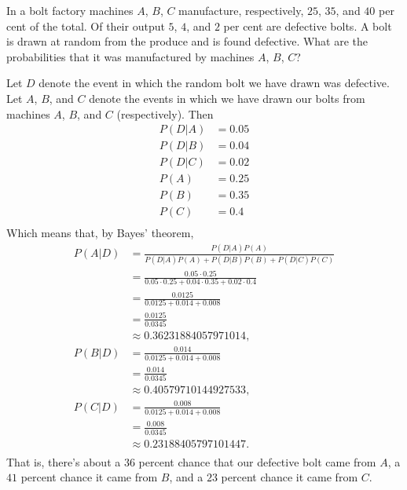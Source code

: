 \begin{problem}[Handout 4, \# 8]
  In a bolt factory machines \(A\), \(B\), \(C\) manufacture, respectively,
  \(25\), \(35\), and \(40\) per cent of the total. Of their output \(5\),
  \(4\), and \(2\) per cent are defective bolts. A bolt is drawn at random
  from the produce and is found defective. What are the probabilities that
  it was manufactured by machines \(A\), \(B\), \(C\)?
\end{problem}
\begin{solution}
  Let $D$ denote the event in which the random bolt we have drawn was
  defective. Let $A$, $B$, and $C$ denote the events in which we have drawn
  our bolts from machines $A$, $B$, and $C$ (respectively). Then
  \begin{align*}
    P(D|A) &=0.05 \\
    P(D|B) &=0.04 \\
    P(D|C) &=0.02 \\
    P(A)&=0.25 \\
    P(B)&=0.35 \\
    P(C)&=0.4 \\
  \end{align*}
  Which means that, by Bayes' theorem,
  \begin{align*}
    P(A|D) &=\frac{P(D|A)P(A)}{P(D|A)P(A)
             +P(D|B)P(B)+P(D|C)P(C)} \\
           &=\frac{0.05 \cdot 0.25}{0.05 \cdot 0.25 + 0.04 \cdot 0.35 + 0.02 \cdot 0.4 } \\
           &= \frac{0.0125}{0.0125 + 0.014 + 0.008} \\
           &= \frac{0.0125}{0.0345} \\
           &\approx \num{0.36231884057971014}, \\
    P(B|D) &= \frac{0.014}{0.0125 + 0.014 + 0.008} \\
           &= \frac{0.014}{0.0345} \\
           &\approx \num{0.40579710144927533}, \\
    P(C|D) &= \frac{0.008}{0.0125 + 0.014 + 0.008} \\
           &= \frac{0.008}{0.0345} \\
           &\approx \num{0.23188405797101447}.\\
  \end{align*}
  That is, there's about a $36$ percent chance that our defective bolt came
  from $A$, a $41$ percent chance it came from $B$, and a $23$ percent
  chance it came from $C$.
\end{solution}
\newpage

